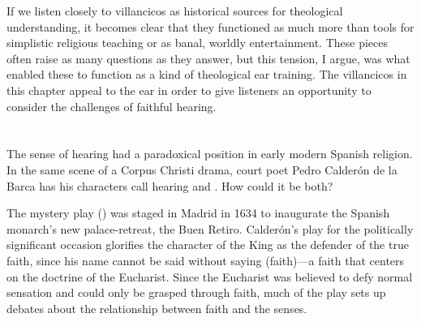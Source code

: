 
If we listen closely to villancicos as historical sources for theological
understanding, it becomes clear that they functioned as much more than tools for
simplistic religious teaching or as banal, worldly entertainment.
These pieces often raise as many questions as they answer, but this tension, I
argue, was what enabled these to function as a kind of theological ear training.
The villancicos in this chapter appeal to the ear in order to give listeners an
opportunity to consider the challenges of faithful hearing.



\section{}

The sense of hearing had a paradoxical position in early modern Spanish
religion.
In the same scene of a Corpus Christi drama, court poet Pedro Calderón de la
Barca has his characters call hearing 
and .
How could it be both?

The mystery play () 
was staged in Madrid in 1634 to inaugurate the Spanish monarch's new
palace-retreat, the Buen Retiro.%
    \Autocite{Calderon:Retiro}
Calderón's play for the politically significant occasion glorifies the
character of the King as the defender of the true faith, since his name
 cannot be said without saying  (faith)---a faith
that centers on the doctrine of the Eucharist.
Since the Eucharist was believed to defy normal sensation and could only be
grasped through faith, much of the play sets up debates about the relationship
between faith and the senses.


